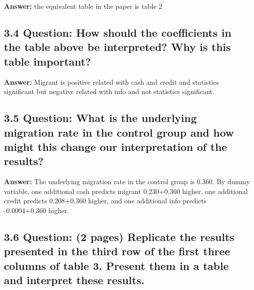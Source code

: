\documentclass[
]{article}
\begin{document}
\textbf{Answer:} the equivalent table in the paper is table 2

\clearpage

\hypertarget{question-how-should-the-coefficients-in-the-table-above-be-interpreted-why-is-this-table-important}{%
\subsection{\texorpdfstring{3.4 \textbf{Question: How should the
coefficients in the table above be interpreted? Why is this table
important?}}{3.4 Question: How should the coefficients in the table above be interpreted? Why is this table important?}}\label{question-how-should-the-coefficients-in-the-table-above-be-interpreted-why-is-this-table-important}}

\textbf{Answer:} Migrant is positive related with cash and credit and
statistics significant but negative related with info and not statistics
significant.

\clearpage

\hypertarget{question-what-is-the-underlying-migration-rate-in-the-control-group-and-how-might-this-change-our-interpretation-of-the-results}{%
\subsection{\texorpdfstring{3.5 \textbf{Question: What is the underlying
migration rate in the control group and how might this change our
interpretation of the results?
}}{3.5 Question: What is the underlying migration rate in the control group and how might this change our interpretation of the results? }}\label{question-what-is-the-underlying-migration-rate-in-the-control-group-and-how-might-this-change-our-interpretation-of-the-results}}

\textbf{Answer:} The underlying migration rate in the control group is
0.360. By dummy variable, one additional cash predicts migrant
0.230+0.360 higher, one additional credit predicts 0.208+0.360 higher,
and one additional info predicts -0.0004+0.360 higher.

\clearpage

\hypertarget{question-2-pages-replicate-the-results-presented-in-the-third-row-of-the-first-three-columns-of-table-3.-present-them-in-a-table-and-interpret-these-results.}{%
\subsection{\texorpdfstring{3.6 \textbf{Question: (2 pages) Replicate
the results presented in the third row of the first three columns of
table 3. Present them in a table and interpret these results.
}}{3.6 Question: (2 pages) Replicate the results presented in the third row of the first three columns of table 3. Present them in a table and interpret these results. }}\label{question-2-pages-replicate-the-results-presented-in-the-third-row-of-the-first-three-columns-of-table-3.-present-them-in-a-table-and-interpret-these-results.}}
\end{document}
